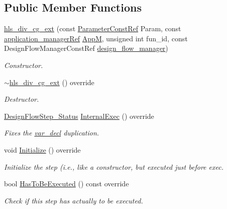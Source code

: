 \subsection*{Public Member Functions}
\begin{DoxyCompactItemize}
\item 
\hyperlink{classhls__div__cg__ext_abefe837ff9c468b61fad64daed8f967e}{hls\+\_\+div\+\_\+cg\+\_\+ext} (const \hyperlink{Parameter_8hpp_a37841774a6fcb479b597fdf8955eb4ea}{Parameter\+Const\+Ref} Param, const \hyperlink{application__manager_8hpp_a04ccad4e5ee401e8934306672082c180}{application\+\_\+manager\+Ref} \hyperlink{classFrontendFlowStep_a0ac0d8db2a378416583f51c4faa59d15}{AppM}, unsigned int fun\+\_\+id, const Design\+Flow\+Manager\+Const\+Ref \hyperlink{classDesignFlowStep_ab770677ddf087613add30024e16a5554}{design\+\_\+flow\+\_\+manager})
\begin{DoxyCompactList}\small\item\em Constructor. \end{DoxyCompactList}\item 
\hyperlink{classhls__div__cg__ext_acfd4c2e4729d910982f064fd49832f6b}{$\sim$hls\+\_\+div\+\_\+cg\+\_\+ext} () override
\begin{DoxyCompactList}\small\item\em Destructor. \end{DoxyCompactList}\item 
\hyperlink{design__flow__step_8hpp_afb1f0d73069c26076b8d31dbc8ebecdf}{Design\+Flow\+Step\+\_\+\+Status} \hyperlink{classhls__div__cg__ext_ad7e670a6ce48646651b6fe689e3d85d4}{Internal\+Exec} () override
\begin{DoxyCompactList}\small\item\em Fixes the \hyperlink{structvar__decl}{var\+\_\+decl} duplication. \end{DoxyCompactList}\item 
void \hyperlink{classhls__div__cg__ext_a68ca8c0cd178e82f30fd07b8e471604d}{Initialize} () override
\begin{DoxyCompactList}\small\item\em Initialize the step (i.\+e., like a constructor, but executed just before exec. \end{DoxyCompactList}\item 
bool \hyperlink{classhls__div__cg__ext_a9325b4922476e33095be75cbf2ec08f9}{Has\+To\+Be\+Executed} () const override
\begin{DoxyCompactList}\small\item\em Check if this step has actually to be executed. \end{DoxyCompactList}\end{DoxyCompactItemize}
